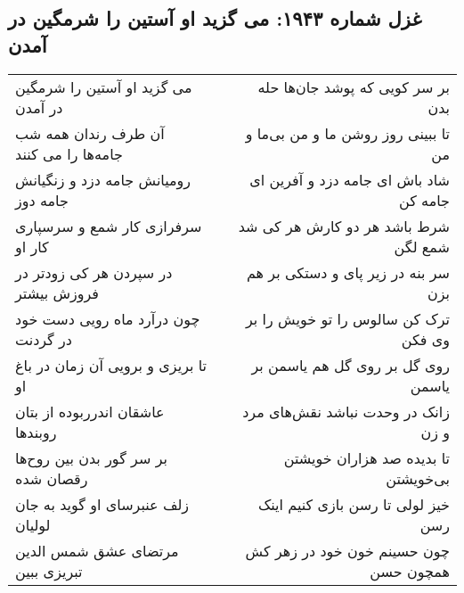 \begin{center}
\section*{غزل شماره ۱۹۴۳: می گزید او آستین را شرمگین در آمدن}
\label{sec:1943}
\begin{longtable}{l p{0.5cm} r}
می گزید او آستین را شرمگین در آمدن
&&
بر سر کویی که پوشد جان‌ها حله بدن
\\
آن طرف رندان همه شب جامه‌ها را می کنند
&&
تا ببینی روز روشن ما و من بی‌ما و من
\\
رومیانش جامه دزد و زنگیانش جامه دوز
&&
شاد باش ای جامه دزد و آفرین ای جامه کن
\\
سرفرازی کار شمع و سرسپاری کار او
&&
شرط باشد هر دو کارش هر کی شد شمع لگن
\\
در سپردن هر کی زودتر در فروزش بیشتر
&&
سر بنه در زیر پای و دستکی بر هم بزن
\\
چون درآرد ماه رویی دست خود در گردنت
&&
ترک کن سالوس را تو خویش را بر وی فکن
\\
تا بریزی و برویی آن زمان در باغ او
&&
روی گل بر روی گل هم یاسمن بر یاسمن
\\
عاشقان اندرربوده از بتان روبندها
&&
زانک در وحدت نباشد نقش‌های مرد و زن
\\
بر سر گور بدن بین روح‌ها رقصان شده
&&
تا بدیده صد هزاران خویشتن بی‌خویشتن
\\
زلف عنبرسای او گوید به جان لولیان
&&
خیز لولی تا رسن بازی کنیم اینک رسن
\\
مرتضای عشق شمس الدین تبریزی ببین
&&
چون حسینم خون خود در زهر کش همچون حسن
\\
\end{longtable}
\end{center}
